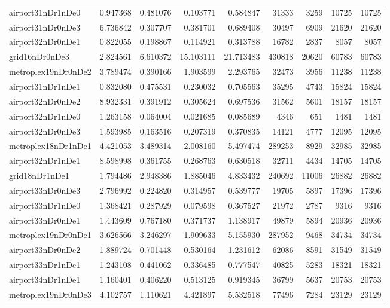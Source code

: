 \begin{longtable}{|l|r|r|r|r|r|r|r|r|}
airport31nDr1nDe0 & 0.947368 & 0.481076 & 0.103771 & 0.584847 & 31333 & 3259 & 10725 & 10725 \\
airport31nDr0nDe3 & 6.736842 & 0.307707 & 0.381701 & 0.689408 & 30497 & 6909 & 21620 & 21620 \\
airport32nDr0nDe1 & 0.822055 & 0.198867 & 0.114921 & 0.313788 & 16782 & 2837 & 8057 & 8057 \\
grid16nDr0nDe3 & 2.824561 & 6.610372 & 15.103111 & 21.713483 & 430818 & 20620 & 60783 & 60783 \\
metroplex19nDr0nDe2 & 3.789474 & 0.390166 & 1.903599 & 2.293765 & 32473 & 3956 & 11238 & 11238 \\
airport31nDr1nDe1 & 0.832080 & 0.475531 & 0.230032 & 0.705563 & 35295 & 4743 & 15824 & 15824 \\
airport32nDr0nDe2 & 8.932331 & 0.391912 & 0.305624 & 0.697536 & 31562 & 5601 & 18157 & 18157 \\
airport32nDr1nDe0 & 1.263158 & 0.064004 & 0.021685 & 0.085689 & 4346 & 651 & 1481 & 1481 \\
airport32nDr0nDe3 & 1.593985 & 0.163516 & 0.207319 & 0.370835 & 14121 & 4777 & 12095 & 12095 \\
metroplex18nDr1nDe1 & 4.421053 & 3.489314 & 2.008160 & 5.497474 & 289253 & 8929 & 32985 & 32985 \\
airport32nDr1nDe1 & 8.598998 & 0.361755 & 0.268763 & 0.630518 & 32711 & 4434 & 14705 & 14705 \\
grid18nDr1nDe1 & 1.794486 & 2.948386 & 1.885046 & 4.833432 & 240692 & 11006 & 26882 & 26882 \\
airport33nDr0nDe3 & 2.796992 & 0.224820 & 0.314957 & 0.539777 & 19705 & 5897 & 17396 & 17396 \\
airport33nDr1nDe0 & 1.368421 & 0.287929 & 0.079598 & 0.367527 & 21972 & 2787 & 9316 & 9316 \\
airport33nDr0nDe1 & 1.443609 & 0.767180 & 0.371737 & 1.138917 & 49879 & 5894 & 20936 & 20936 \\
metroplex19nDr0nDe1 & 3.626566 & 3.246297 & 1.909633 & 5.155930 & 287952 & 9468 & 34734 & 34734 \\
airport33nDr0nDe2 & 1.889724 & 0.701448 & 0.530164 & 1.231612 & 62086 & 8591 & 31549 & 31549 \\
airport33nDr1nDe1 & 1.243108 & 0.441062 & 0.336485 & 0.777547 & 40825 & 5283 & 18321 & 18321 \\
airport34nDr1nDe1 & 1.160401 & 0.406220 & 0.513125 & 0.919345 & 36799 & 5637 & 20753 & 20753 \\
metroplex19nDr0nDe3 & 4.102757 & 1.110621 & 4.421897 & 5.532518 & 77496 & 7284 & 23129 & 23129 \\

\end{longtable}
